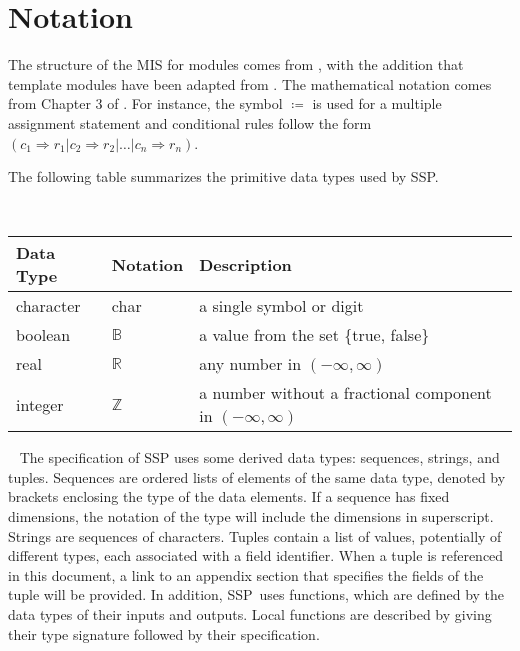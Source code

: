 \documentclass[12pt, titlepage]{article}
\newcommand{\progname}{SSP}
\begin{document}

\section{Notation}

The structure of the MIS for modules comes from \citet{HoffmanAndStrooper1995},
with the addition that template modules have been adapted from
\cite{GhezziEtAl2003}.  The mathematical notation comes from Chapter 3 of
\citet{HoffmanAndStrooper1995}.  For instance, the symbol $\coloneqq$ is used 
for a multiple assignment statement and conditional rules follow the form $(c_1
\Rightarrow r_1 | c_2 \Rightarrow r_2 | \dots | c_n \Rightarrow r_n )$.

The following table summarizes the primitive data types used by \progname.

~\newline \renewcommand*{\arraystretch}{1.5}
\begin{tabular}{p{} p{} p{}}
  \hline \textbf{Data Type} & \textbf{Notation} & \textbf{Description}
  \\ \hline
  
  character & char & a single symbol or digit\\

  boolean & $\mathbb{B}$ & a value from the set \{true, false\}\\
  
  real & $\mathbb{R}$ & any number in $\left( -\infty, \infty \right)$\\
  
  integer & $\mathbb{Z}$ & a number without a fractional component in $\left( 
  -\infty, \infty \right)$\\
  \bottomrule
\end{tabular}

~\newline
The specification of \progname{} uses some derived data types: sequences, 
strings, and tuples. Sequences are ordered lists of elements of the same data 
type, denoted by brackets enclosing the type of the data elements. If a 
sequence has fixed dimensions, the notation of the type will include the 
dimensions in superscript. Strings are sequences of characters. Tuples contain 
a list of values, potentially of different types, each associated with a field 
identifier. When a tuple is referenced in this document, a link to an appendix 
section that specifies the fields of the tuple will be provided. In addition, 
\progname \ uses functions, which are defined by the data types of their inputs 
and outputs. Local functions are described by giving their type signature 
followed by their specification.
\end{document}
